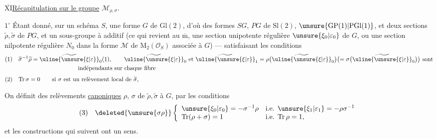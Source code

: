 



\uline{$\overline{\mathrm{XI}}$}\quad\uline{Récapitulation sur le groupe} $\mathcal{M}_{\rho,\sigma}$.


\textcircled{$1^\circ$} Étant donné, sur un schéma $S$, une forme $G$ de $\mathrm{Gl}(2)$, d'où des formes $SG$, $PG$ de $\mathrm{Sl}(2)$, $\unsure{\mathrm{GP}(1)|\mathrm{PGl}(1)}$, et deux sections $\widetilde\rho,\widetilde\sigma$ de $PG$, et un sous-groupe à   additif 
(ce qui revient au $\overline{\mathrm m}$, une section  unipotente régulière  $\unsure{\xi_0|\varepsilon_0}$ de $G$, ou une section nilpotente régulière $N_0$ dans la forme $\mathcal M$ de $\mathrm{M}_2(\mathcal O_S)$ associée à $G$) --- satisfaisant les conditions
\[
\begin{aligned}
(1)\quad &\widetilde\sigma^{-1}\widetilde\rho
  =\widetilde{\uline{\unsure{\xi|\varepsilon}}}_0(1),\qquad
  \widetilde{\uline{\unsure{\xi|\varepsilon}}}_0\text{ et }
  \widetilde{\uline{\unsure{\xi|\varepsilon}}}_1
  =\rho\bigl(\widetilde{\uline{\unsure{\xi|\varepsilon}}}_0\bigr)
  \bigl(=\sigma\bigl(\widetilde{\uline{\unsure{\xi|\varepsilon}}}_0\bigr)\bigr)
  \text{ sont}\\
 &\hspace{10em}\text{indépendants sur chaque fibre}\\[4pt]
(2)\quad &\mathrm{Tr}\,\sigma=0\qquad
 \text{si }\sigma\text{ est un relèvement local de }\widetilde\sigma,
\end{aligned}
\]

On définit des relèvements \uline{canoniques} $\rho$, $\sigma$ de $\widetilde\rho,\widetilde\sigma$ à $G$,  par les conditions
\[
(3)\quad\deleted{\unsure{\sigma\rho}}
\left\{\begin{array}{ll}
 \unsure{\xi_0|\varepsilon_0}=-\sigma^{-1}\rho
 &\text{i.e. }\unsure{\xi_1|\varepsilon_1}=-\rho\sigma^{-1}\\
 \mathrm{Tr}(\rho+\sigma)=1
 &\text{i.e. }\mathrm{Tr}\,\rho=1,
\end{array}\right.
\]
et les constructions qui suivent ont un sens.

